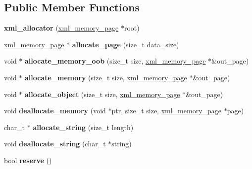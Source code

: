 \subsection*{Public Member Functions}
\begin{DoxyCompactItemize}
\item 
\hypertarget{structxml__allocator_ad41b1a18595953aa71a470b45921c0fd}{{\bfseries xml\+\_\+allocator} (\hyperlink{structxml__memory__page}{xml\+\_\+memory\+\_\+page} $\ast$root)}\label{structxml__allocator_ad41b1a18595953aa71a470b45921c0fd}

\item 
\hypertarget{structxml__allocator_a4b399b01e530220ec5849b912b84063b}{\hyperlink{structxml__memory__page}{xml\+\_\+memory\+\_\+page} $\ast$ {\bfseries allocate\+\_\+page} (size\+\_\+t data\+\_\+size)}\label{structxml__allocator_a4b399b01e530220ec5849b912b84063b}

\item 
\hypertarget{structxml__allocator_a30bb557bc040de54c041c6d3dca6772e}{void $\ast$ {\bfseries allocate\+\_\+memory\+\_\+oob} (size\+\_\+t size, \hyperlink{structxml__memory__page}{xml\+\_\+memory\+\_\+page} $\ast$\&out\+\_\+page)}\label{structxml__allocator_a30bb557bc040de54c041c6d3dca6772e}

\item 
\hypertarget{structxml__allocator_afac0b9fac2c2962972f60d0346eb4f39}{void $\ast$ {\bfseries allocate\+\_\+memory} (size\+\_\+t size, \hyperlink{structxml__memory__page}{xml\+\_\+memory\+\_\+page} $\ast$\&out\+\_\+page)}\label{structxml__allocator_afac0b9fac2c2962972f60d0346eb4f39}

\item 
\hypertarget{structxml__allocator_a5c7a0614c72c3e73f561bb3f98c314e0}{void $\ast$ {\bfseries allocate\+\_\+object} (size\+\_\+t size, \hyperlink{structxml__memory__page}{xml\+\_\+memory\+\_\+page} $\ast$\&out\+\_\+page)}\label{structxml__allocator_a5c7a0614c72c3e73f561bb3f98c314e0}

\item 
\hypertarget{structxml__allocator_a5df417155487cce4e0460b123ac33dc6}{void {\bfseries deallocate\+\_\+memory} (void $\ast$ptr, size\+\_\+t size, \hyperlink{structxml__memory__page}{xml\+\_\+memory\+\_\+page} $\ast$page)}\label{structxml__allocator_a5df417155487cce4e0460b123ac33dc6}

\item 
\hypertarget{structxml__allocator_ac5ec2b5d41672d6494a2742e95e525b3}{char\+\_\+t $\ast$ {\bfseries allocate\+\_\+string} (size\+\_\+t length)}\label{structxml__allocator_ac5ec2b5d41672d6494a2742e95e525b3}

\item 
\hypertarget{structxml__allocator_af32c538db4d562c2d0bfe15f7c0aa879}{void {\bfseries deallocate\+\_\+string} (char\+\_\+t $\ast$string)}\label{structxml__allocator_af32c538db4d562c2d0bfe15f7c0aa879}

\item 
\hypertarget{structxml__allocator_ac831a283ec3bcbe22fd3ce3be98ec347}{bool {\bfseries reserve} ()}\label{structxml__allocator_ac831a283ec3bcbe22fd3ce3be98ec347}

\end{DoxyCompactItemize}
